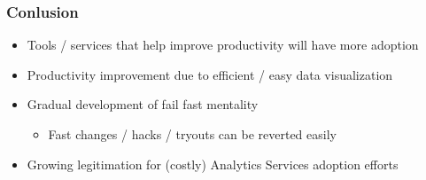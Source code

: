\hypertarget{conlusion}{%
\subsubsection{Conlusion}\label{conlusion}}

\begin{itemize}
\tightlist
\item
  Tools / services that help improve productivity will have more
  adoption
\item
  Productivity improvement due to efficient / easy data visualization
\item
  Gradual development of fail fast mentality

  \begin{itemize}
  \tightlist
  \item
    Fast changes / hacks / tryouts can be reverted easily
  \end{itemize}
\item
  Growing legitimation for (costly) Analytics Services adoption efforts
\end{itemize}
